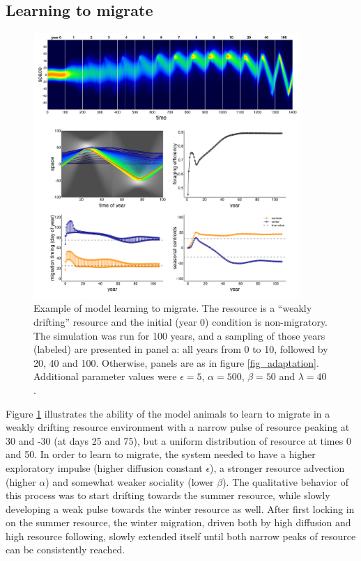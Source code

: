 \documentclass[utf8]{frontiersSCNS} %
\begin{document}
	\subsection{Learning to migrate}
	
	\begin{figure}
		\includegraphics[width = 0.9\textwidth]{figures/example2_learningtomigrate.png} 
		
		\caption{\label{fig_learningtomigrate} Example of model learning to migrate. The resource is a ``weakly drifting'' resource and the initial (year 0) condition is non-migratory. The simulation was run for 100 years, and a sampling of those years (labeled) are presented in panel a: all years from 0 to 10, followed by 20, 40 and 100. Otherwise, panels are as in figure \ref{fig_adaptation}. Additional parameter values were $\epsilon = 5$, $\alpha = 500$, $\beta = 50$ and $\lambda = 40$.}
	\end{figure}
	
	Figure \ref{fig_learningtomigrate} illustrates the ability of the model animals to learn to migrate in a weakly drifting resource environment with a narrow pulse of resource peaking at 30 and -30 (at days 25 and 75), but a uniform distribution of resource at times 0 and 50. In order to learn to migrate, the system needed to have a higher exploratory impulse (higher diffusion constant $\epsilon$), a stronger resource advection (higher $\alpha$) and somewhat weaker sociality (lower $\beta$). The qualitative behavior of this process was to start drifting towards the summer resource, while slowly developing a weak pulse towards the winter resource as well. After first locking in on the summer resource, the winter migration, driven both by high diffusion and high resource following, slowly extended itself until both narrow peaks of resource can be consistently reached.
	
\end{document}
